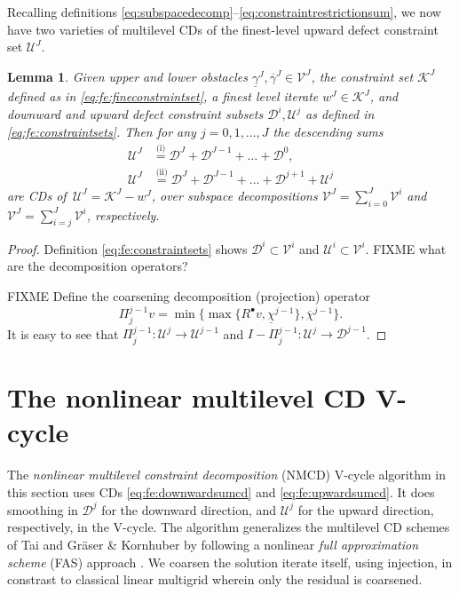 \documentclass[letterpaper,final,12pt,reqno]{amsart}
\theoremstyle{cstyle}
\newtheorem{lemma}[theorem]{Lemma}
\theoremstyle{cstyle*}
\theoremstyle{dstyle}
\numberwithin{equation}{section}
\numberwithin{figure}{section}
\numberwithin{table}{section}
\numberwithin{theorem}{section}
\newcommand{\cK}{\mathcal{K}}
\newcommand{\cV}{\mathcal{V}}
\newcommand{\iR}{R^{\bullet}}
\begin{document}
Recalling definitions \eqref{eq:subspacedecomp}--\eqref{eq:constraintrestrictionsum}, we now have two varieties of multilevel CDs of the finest-level upward defect constraint set $\mathcal{U}^J$.

\begin{lemma}  Given upper and lower obstacles $\underline{\gamma}^J,\overline{\gamma}^J \in \cV^J$, the constraint set $\cK^J$ defined as in \eqref{eq:fe:fineconstraintset}, a finest level iterate $w^J \in \cK^J$, and downward and upward defect constraint subsets $\mathcal{D}^i,\mathcal{U}^j$ as defined in \eqref{eq:fe:constraintsets}.  Then for any $j=0,1,\dots,J$ the descending sums
\begin{align}
\mathcal{U}^J &\stackrel{\text{(i)}}{=} \mathcal{D}^J + \mathcal{D}^{J-1} + \dots + \mathcal{D}^0, \label{eq:fe:downwardsumcd} \\
\mathcal{U}^J &\stackrel{\text{(ii)}}{=} \mathcal{D}^J + \mathcal{D}^{J-1} + \dots + \mathcal{D}^{j+1} + \mathcal{U}^j \label{eq:fe:upwardsumcd}
\end{align}
are CDs of\, $\mathcal{U}^J = \cK^J - w^J$, over subspace decompositions $\cV^J=\sum_{i=0}^J \cV^i$ and $\cV^J=\sum_{i=j}^J \cV^i$, respectively.
\end{lemma}

\begin{proof}  Definition \eqref{eq:fe:constraintsets} shows $\mathcal{D}^i \subset \cV^i$ and $\mathcal{U}^i \subset \cV^i$.  FIXME what are the decomposition operators?

FIXME Define the coarsening decomposition (projection) operator
    $$\Pi_j^{j-1} v = \min\{\max\{\iR v, \underline{\chi}^{j-1}\}, \overline{\chi}^{j-1}\}.$$
It is easy to see that $\Pi_j^{j-1}:\mathcal{U}^j \to \mathcal{U}^{j-1}$ and $I-\Pi_j^{j-1}:\mathcal{U}^j \to \mathcal{D}^{j-1}$.
\end{proof}


\section{The nonlinear multilevel CD V-cycle} \label{sec:vcycle}

The \emph{nonlinear multilevel constraint decomposition} (NMCD) V-cycle algorithm in this section uses CDs \eqref{eq:fe:downwardsumcd} and \eqref{eq:fe:upwardsumcd}.  It does smoothing in $\mathcal{D}^j$ for the downward direction, and $\mathcal{U}^j$ for the upward direction, respectively, in the V-cycle.  The algorithm generalizes the multilevel CD schemes of Tai \cite{Tai2003} and Gr\"aser \& Kornhuber \cite[Algorithm 4.7]{GraeserKornhuber2009} by following a nonlinear \emph{full approximation scheme} (FAS) approach \cite{BrandtLivne2011}.  We coarsen the solution iterate itself, using injection, in constrast to classical linear multigrid wherein only the residual is coarsened.
\end{document}
